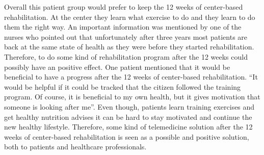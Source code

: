 Overall this patient group would prefer to keep the 12 weeks of center-based rehabilitation. At the center they learn what exercise to do and they learn to do them the right way. An important information was mentioned by one of the nurses who pointed out that unfortunately after three years most patients are back at the same state of health as they were before they started rehabilitation. Therefore, to do some kind of rehabilitation program after the 12 weeks could possibly have an positive effect. One patient mentioned that it would be beneficial to have a progress after the 12 weeks of center-based rehabilitation. “It would be helpful if it could be tracked that the citizen followed the training program. Of course, it is beneficial to my own health, but it gives motivation that someone is looking after me”. Even though, patients learn training exercises and get healthy nutrition advises it can be hard to stay motivated and continue the new healthy lifestyle. Therefore, some kind of telemedicine solution after the 12 weeks of center-based rehabilitation is seen as a possible and positive solution, both to patients and healthcare professionals.        


















































